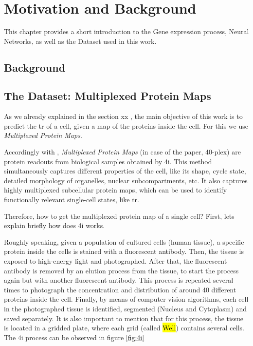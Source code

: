 
\chapter{Motivation and Background}
\label{ch:Motivation_and_Background}

This chapter provides a short introduction to the Gene expression process, Neural Networks, as well as the Dataset used in this work.

\section{Background}
\label{sec:Motivation_and_Background:Background}

\section{The Dataset: Multiplexed Protein Maps}
\label{sec:Motivation_and_Background:Dataset}

As we already explained in the section xx , the main objective of this work is to predict the \Gls{tr} of a cell, given a map of the proteins inside the cell. For this we use \textit{Multiplexed Protein Maps}.

Accordingly with \cite{Guteaar7042}, \textit{Multiplexed Protein Maps} (in case of the paper, 40-plex) are protein readouts from biological samples obtained by \Gls{4i}. This method simultaneously captures different properties of the cell, like its shape, cycle state, detailed morphology of organelles, nuclear subcompartments, etc. It also captures highly multiplexed subcellular protein maps, which can be used to identify functionally relevant single-cell states, like \Gls{tr}.

Therefore, how to get the multiplexed protein map of a single cell? First, lets explain briefly how does \gls{4i} works.

Roughly speaking, given a population of cultured cells (human tissue), a specific protein inside the cells is stained with a fluorescent antibody. Then, the tissue is exposed to high-energy light and photographed. After that, the fluorescent antibody is removed by an elution process from the tissue, to start the process again but with another fluorescent antibody. This process is repeated several times to photograph the concentration and distribution of around 40 different proteins inside the cell. Finally, by means of computer vision algorithms, each cell in the photographed tissue is identified, segmented (Nucleus and Cytoplasm) and saved separately. It is also important to mention that for this process, the tissue is located in a gridded plate, where each grid (called \hl{Well}) contains several cells. The \gls{4i} process can be observed in figure \cref{fig:4i}

